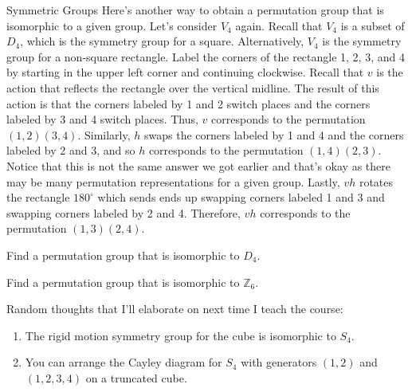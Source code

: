\begin{section}{Symmetric Groups}
Here's another way to obtain a permutation group that is isomorphic to a given group.  Let's consider $V_4$ again.  Recall that $V_4$ is a subset of $D_4$, which is the symmetry group for a square.  Alternatively, $V_4$ is the symmetry group for a non-square rectangle.  Label the corners of the rectangle 1, 2, 3, and 4 by starting in the upper left corner and continuing clockwise.  Recall that $v$ is the action that reflects the rectangle over the vertical midline.  The result of this action is that the corners labeled by 1 and 2 switch places and the corners labeled by 3 and 4 switch places.  Thus, $v$ corresponds to the permutation $(1,2)(3,4)$.  Similarly, $h$ swaps the corners labeled by 1 and 4 and the corners labeled by 2 and 3, and so $h$ corresponds to the permutation $(1,4)(2,3)$.  Notice that this is not the same answer we got earlier and that's okay as there may be many permutation representations for a given group.  Lastly, $vh$ rotates the rectangle $180^{\circ}$ which sends ends up swapping corners labeled 1 and 3 and swapping corners labeled by 2 and 4.  Therefore, $vh$ corresponds to the permutation $(1,3)(2,4)$.

\begin{exercise}
Find a permutation group that is isomorphic to $D_4$.
\end{exercise}

\begin{exercise}
Find a permutation group that is isomorphic to $\mathbb{Z}_6$.
\end{exercise}

Random thoughts that I'll elaborate on next time I teach the course:
\begin{enumerate}
\item The rigid motion symmetry group for the cube is isomorphic to $S_4$.
\item You can arrange the Cayley diagram for $S_4$ with generators $(1,2)$ and $(1,2,3,4)$ on a truncated cube. 
\end{enumerate}

\end{section}

